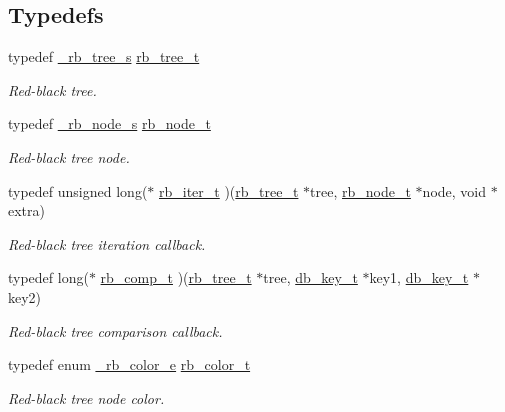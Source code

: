\subsection*{Typedefs}
\begin{CompactItemize}
\item 
typedef \hyperlink{struct__rb__tree__s}{\_\-rb\_\-tree\_\-s} \hyperlink{group__dbprim__rbtree_ga0}{rb\_\-tree\_\-t}
\begin{CompactList}\small\item\em Red-black tree. \item\end{CompactList}\item 
typedef \hyperlink{struct__rb__node__s}{\_\-rb\_\-node\_\-s} \hyperlink{group__dbprim__rbtree_ga1}{rb\_\-node\_\-t}
\begin{CompactList}\small\item\em Red-black tree node. \item\end{CompactList}\item 
typedef unsigned long($\ast$ \hyperlink{group__dbprim__rbtree_ga2}{rb\_\-iter\_\-t} )(\hyperlink{struct__rb__tree__s}{rb\_\-tree\_\-t} $\ast$tree, \hyperlink{struct__rb__node__s}{rb\_\-node\_\-t} $\ast$node, void $\ast$extra)
\begin{CompactList}\small\item\em Red-black tree iteration callback. \item\end{CompactList}\item 
typedef long($\ast$ \hyperlink{group__dbprim__rbtree_ga3}{rb\_\-comp\_\-t} )(\hyperlink{struct__rb__tree__s}{rb\_\-tree\_\-t} $\ast$tree, \hyperlink{struct__db__key__s}{db\_\-key\_\-t} $\ast$key1, \hyperlink{struct__db__key__s}{db\_\-key\_\-t} $\ast$key2)
\begin{CompactList}\small\item\em Red-black tree comparison callback. \item\end{CompactList}\item 
typedef enum \hyperlink{group__dbprim__rbtree_ga53}{\_\-rb\_\-color\_\-e} \hyperlink{group__dbprim__rbtree_ga4}{rb\_\-color\_\-t}
\begin{CompactList}\small\item\em Red-black tree node color. \item\end{CompactList}\end{CompactItemize}
